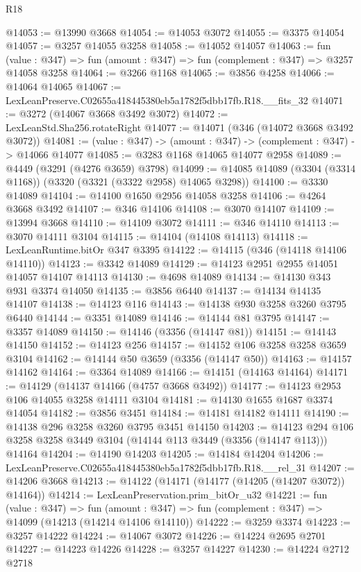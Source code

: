 \begin{lexlean}{R18}
\begin{coremodule}
@14053 := @13990 @3668
@14054 := @14053 @3072
@14055 := @3375 @14054
@14057 := @3257 @14055 @3258
@14058 := @14052 @14057
@14063 := fun (value : @347) => fun (amount : @347) => fun (complement : @347) => @3257 @14058 @3258
@14064 := @3266 @1168
@14065 := @3856 @4258
@14066 := @14064 @14065
@14067 := LexLeanPreserve.C02655a418445380eb5a1782f5dbb17fb.R18.__fits_32
@14071 := @3272 (@14067 @3668 @3492 @3072)
@14072 := LexLeanStd.Sha256.rotateRight
@14077 := @14071 (@346 (@14072 @3668 @3492 @3072))
@14081 := (value : @347) -> (amount : @347) -> (complement : @347) -> @14066 @14077
@14085 := @3283 @1168 @14065 @14077 @2958
@14089 := @4449 (@3291 (@4276 @3659) @3798)
@14099 := @14085 @14089 (@3304 (@3314 @1168)) (@3320 (@3321 (@3322 @2958) @14065 @3298))
@14100 := @3330 @14089
@14104 := @14100 @1650 @2956 @14058 @3258
@14106 := @4264 @3668 @3492
@14107 := @346 @14106
@14108 := @3070 @14107
@14109 := @13994 @3668
@14110 := @14109 @3072
@14111 := @346 @14110
@14113 := @3070 @14111 @3104
@14115 := @14104 (@14108 @14113)
@14118 := LexLeanRuntime.bitOr @347 @3395
@14122 := @14115 (@346 (@14118 @14106 @14110))
@14123 := @3342 @14089
@14129 := @14123 @2951 @2955 @14051 @14057 @14107 @14113
@14130 := @4698 @14089
@14134 := @14130 @343 @931 @3374 @14050
@14135 := @3856 @6440
@14137 := @14134 @14135 @14107
@14138 := @14123 @116
@14143 := @14138 @930 @3258 @3260 @3795 @6440
@14144 := @3351 @14089
@14146 := @14144 @81 @3795
@14147 := @3357 @14089
@14150 := @14146 (@3356 (@14147 @81))
@14151 := @14143 @14150
@14152 := @14123 @256
@14157 := @14152 @106 @3258 @3258 @3659 @3104
@14162 := @14144 @50 @3659 (@3356 (@14147 @50))
@14163 := @14157 @14162
@14164 := @3364 @14089
@14166 := @14151 (@14163 @14164)
@14171 := @14129 (@14137 @14166 (@4757 @3668 @3492))
@14177 := @14123 @2953 @106 @14055 @3258 @14111 @3104
@14181 := @14130 @1655 @1687 @3374 @14054
@14182 := @3856 @3451
@14184 := @14181 @14182 @14111
@14190 := @14138 @296 @3258 @3260 @3795 @3451 @14150
@14203 := @14123 @294 @106 @3258 @3258 @3449 @3104 (@14144 @113 @3449 (@3356 (@14147 @113))) @14164
@14204 := @14190 @14203
@14205 := @14184 @14204
@14206 := LexLeanPreserve.C02655a418445380eb5a1782f5dbb17fb.R18.__rel_31
@14207 := @14206 @3668
@14213 := @14122 (@14171 (@14177 (@14205 (@14207 @3072)) @14164))
@14214 := LexLeanPreservation.prim_bitOr_u32
@14221 := fun (value : @347) =>
  fun (amount : @347) => fun (complement : @347) => @14099 (@14213 (@14214 @14106 @14110))
@14222 := @3259 @3374
@14223 := @3257 @14222
@14224 := @14067 @3072
@14226 := @14224 @2695 @2701
@14227 := @14223 @14226
@14228 := @3257 @14227
@14230 := @14224 @2712 @2718

\end{coremodule}
\end{lexlean}
